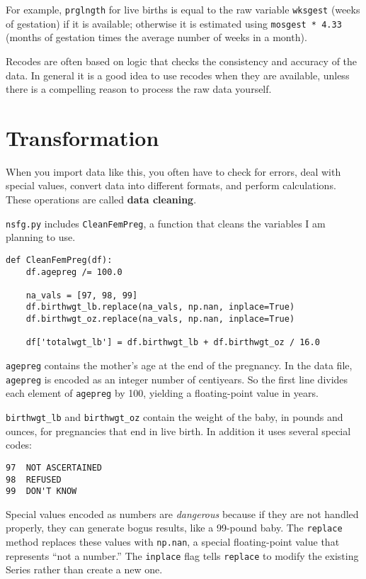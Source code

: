 For example, {\tt prglngth} for live births is equal to the raw
variable {\tt wksgest} (weeks of gestation) if it is available;
otherwise it is estimated using {\tt mosgest * 4.33} (months of
gestation times the average number of weeks in a month).

Recodes are often based on logic that checks the consistency and
accuracy of the data.  In general it is a good idea to use recodes
when they are available, unless there is a compelling reason to
process the raw data yourself.


\section{Transformation}
\label{cleaning}

When you import data like this, you often have to check for errors,
deal with special values, convert data into different formats, and
perform calculations.  These operations are called {\bf data cleaning}.

{\tt nsfg.py} includes {\tt CleanFemPreg}, a function that cleans
the variables I am planning to use.

\begin{verbatim}
def CleanFemPreg(df):
    df.agepreg /= 100.0

    na_vals = [97, 98, 99]
    df.birthwgt_lb.replace(na_vals, np.nan, inplace=True)
    df.birthwgt_oz.replace(na_vals, np.nan, inplace=True)

    df['totalwgt_lb'] = df.birthwgt_lb + df.birthwgt_oz / 16.0    
\end{verbatim}

{\tt agepreg} contains the mother's age at the end of the
pregnancy.  In the data file, {\tt agepreg} is encoded as an integer
number of centiyears.  So the first line divides each element
of {\tt agepreg} by 100, yielding a floating-point value in
years.

\verb"birthwgt_lb" and \verb"birthwgt_oz" contain the weight of the
baby, in pounds and ounces, for pregnancies that end in live birth.
In addition it uses several special codes:

\begin{verbatim}
97	NOT ASCERTAINED
98	REFUSED	 
99	DON'T KNOW
\end{verbatim}

Special values encoded as numbers are {\em dangerous} because if they
are not handled properly, they can generate bogus results, like
a 99-pound baby.  The {\tt replace} method replaces these values with
{\tt np.nan}, a special floating-point value that represents ``not a
number.''  The {\tt inplace} flag tells {\tt replace} to modify the
existing Series rather than create a new one.

